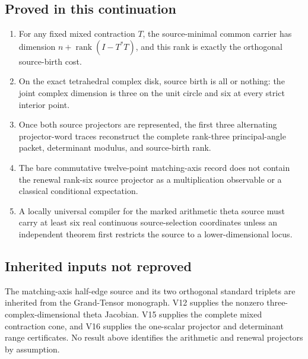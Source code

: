 \documentclass[11pt]{article}
\theoremstyle{definition}
\theoremstyle{remark}
\newcommand{\rank}{\operatorname{rank}}
\begin{document}
\subsection{Proved in this continuation}
\begin{enumerate}[leftmargin=2.2em]
\item For any fixed mixed contraction $T$, the source-minimal common carrier
      has dimension $n+\rank(I-T^*T)$, and this rank is exactly the orthogonal
      source-birth cost.
\item On the exact tetrahedral complex disk, source birth is all or nothing:
      the joint complex dimension is three on the unit circle and six at every
      strict interior point.
\item Once both source projectors are represented, the first three alternating
      projector-word traces reconstruct the complete rank-three principal-angle
      packet, determinant modulus, and source-birth rank.
\item The bare commutative twelve-point matching-axis record does not contain
      the renewal rank-six source projector as a multiplication observable or a
      classical conditional expectation.
\item A locally universal compiler for the marked arithmetic theta source must
      carry at least six real continuous source-selection coordinates unless an
      independent theorem first restricts the source to a lower-dimensional
      locus.
\end{enumerate}

\subsection{Inherited inputs not reproved}
The matching-axis half-edge source and its two orthogonal standard triplets are
inherited from the Grand-Tensor monograph.  V12 supplies the nonzero
three-complex-dimensional theta Jacobian.  V15 supplies the complete mixed
contraction cone, and V16 supplies the one-scalar projector and determinant
range certificates.  No result above identifies the arithmetic and renewal
projectors by assumption.
\end{document}
